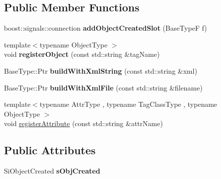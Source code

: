 \subsection*{Public Member Functions}
\begin{DoxyCompactItemize}
\item 
\hypertarget{classsambag_1_1xml_1_1_x_m_l2_object_a951833ea56dd1e016065c112fb851a4c}{
boost::signals::connection {\bfseries addObjectCreatedSlot} (BaseTypeF f)}
\label{classsambag_1_1xml_1_1_x_m_l2_object_a951833ea56dd1e016065c112fb851a4c}

\item 
\hypertarget{classsambag_1_1xml_1_1_x_m_l2_object_ae679ea60582f47899ef4ffa8b321cf54}{
{\footnotesize template$<$typename ObjectType $>$ }\\void {\bfseries registerObject} (const std::string \&tagName)}
\label{classsambag_1_1xml_1_1_x_m_l2_object_ae679ea60582f47899ef4ffa8b321cf54}

\item 
\hypertarget{classsambag_1_1xml_1_1_x_m_l2_object_a326e98bc3acca5061c5510ac6c16b229}{
BaseType::Ptr {\bfseries buildWithXmlString} (const std::string \&xml)}
\label{classsambag_1_1xml_1_1_x_m_l2_object_a326e98bc3acca5061c5510ac6c16b229}

\item 
\hypertarget{classsambag_1_1xml_1_1_x_m_l2_object_a83aa9167825fc66a5646a228d21eba67}{
BaseType::Ptr {\bfseries buildWithXmlFile} (const std::string \&filename)}
\label{classsambag_1_1xml_1_1_x_m_l2_object_a83aa9167825fc66a5646a228d21eba67}

\item 
{\footnotesize template$<$typename AttrType , typename TagClassType , typename ObjectType $>$ }\\void \hyperlink{classsambag_1_1xml_1_1_x_m_l2_object_af56d1121737bec42c2808d9a767e5070}{registerAttribute} (const std::string \&attrName)
\end{DoxyCompactItemize}
\subsection*{Public Attributes}
\begin{DoxyCompactItemize}
\item 
\hypertarget{classsambag_1_1xml_1_1_x_m_l2_object_adb6b5ac2da9cfc82ee313d76e02fa8f4}{
SiObjectCreated {\bfseries sObjCreated}}
\label{classsambag_1_1xml_1_1_x_m_l2_object_adb6b5ac2da9cfc82ee313d76e02fa8f4}

\end{DoxyCompactItemize}


